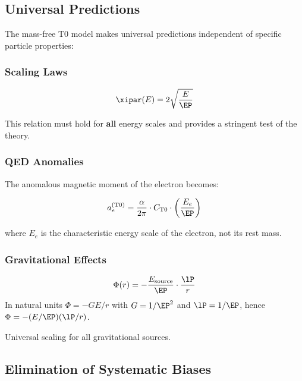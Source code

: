 	\subsection{Universal Predictions}
	\label{subsec:universal_predictions}
	
	The mass-free T0 model makes universal predictions independent of specific particle properties:
	
	\subsubsection{Scaling Laws}
	
	\begin{equation}
		\xipar(E) = 2\sqrt{\frac{E}{\EP}}
		\label{eq:universal_scaling}
	\end{equation}
	
	This relation must hold for \textbf{all} energy scales and provides a stringent test of the theory.
	
	\subsubsection{QED Anomalies}
	
	The anomalous magnetic moment of the electron becomes:
	
	\begin{equation}
		a_e^{(\text{T0})} = \frac{\alpha}{2\pi} \cdot C_{\text{T0}} \cdot \left(\frac{E_e}{\EP}\right)
		\label{eq:qed_universal}
	\end{equation}
	
	where $E_e$ is the characteristic energy scale of the electron, not its rest mass.
	
	\subsubsection{Gravitational Effects}
	
	\begin{equation}
		\Phi(r) = -\frac{E_{\text{source}}}{\EP} \cdot \frac{\lP}{r}
		\label{eq:gravity_universal}
	\end{equation}
	In natural units $\Phi=-GE/r$ with $G=1/\EP^2$ and $\lP=1/\EP$, hence $\Phi=-(E/\EP)(\lP/r)$.
	
	Universal scaling for all gravitational sources.
	
	\subsection{Elimination of Systematic Biases}
	\label{subsec:bias_elimination}
	
